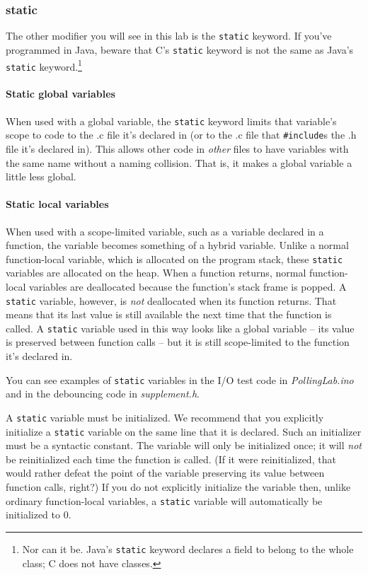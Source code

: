 \subsubsection{static}

The other modifier you will see in this lab is the \lstinline{static} keyword.
If you've programmed in Java, beware that C's \lstinline{static} keyword is not the same as Java's \lstinline{static} keyword.\footnote{
    Nor can it be.
    Java's \lstinline{static} keyword declares a field to belong to the whole class;
    C does not have classes.
}

\paragraph{Static global variables}

When used with a global variable, the \lstinline{static} keyword limits that variable's scope to code to the .c file it's declared in (or to the .c file that \lstinline{#include}s the .h file it's declared in).
This allows other code in \textit{other} files to have variables with the same name without a naming collision.
That is, it makes a global variable a little less global.

\paragraph{Static local variables}

When used with a scope-limited variable, such as a variable declared in a function, the variable becomes something of a hybrid variable.
Unlike a normal function-local variable, which is allocated on the program stack, these \lstinline{static} variables are allocated on the heap.
When a function returns, normal function-local variables are deallocated because the function's stack frame is popped.
A \lstinline{static} variable, however, is \textit{not} deallocated when its function returns.
That means that its last value is still available the next time that the function is called.
A \lstinline{static} variable used in this way looks like a global variable -- its value is preserved between function calls -- but it is still scope-limited to the function it's declared in.

You can see examples of \lstinline{static} variables in the I/O test code in \textit{PollingLab.ino} and in the debouncing code in \textit{supplement.h}.

A \lstinline{static} variable must be initialized.
We recommend that you explicitly initialize a \lstinline{static} variable on the same line that it is declared.
Such an initializer must be a syntactic constant.
The variable will only be initialized once; it will \textit{not} be reinitialized each time the function is called.
(If it were reinitialized, that would rather defeat the point of the variable preserving its value between function calls, right?)
If you do not explicitly initialize the variable then, unlike ordinary function-local variables, a \lstinline{static} variable will automatically be initialized to 0.

